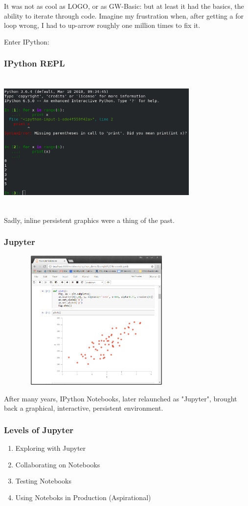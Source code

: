 It was not as cool as LOGO,
or as GW-Basic:
but at least it had the basics,
the ability to iterate through code.
Imagine my frustration when,
after getting a for loop wrong,
I had to up-arrow roughly one million times to
fix it.

Enter IPython:


\begin{frame}
\frametitle{IPython REPL}

\includegraphics[height=7cm,width=10cm]{ipython.png}

\end{frame}

Sadly,
inline persistent graphics
were a thing of the past.

\begin{frame}
\frametitle{Jupyter}

\includegraphics[height=7cm,width=10cm]{jupyter-notebook-page.png}

\end{frame}

After many years,
IPython Notebooks,
later relaunched as "Jupyter",
brought back a graphical,
interactive,
persistent environment.

\begin{frame}
\frametitle{Levels of Jupyter}

\begin{enumerate}
\item Exploring with Jupyter
\item Collaborating on Notebooks
\item Testing Notebooks
\item Using Noteboks in Production (Aspirational)
\end{enumerate}

\end{frame}

